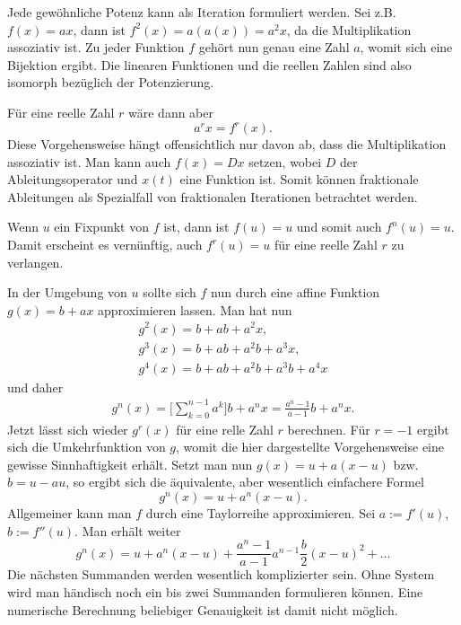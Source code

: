 \documentclass[a4paper,10pt,fleqn,twocolumn,twoside]{article}
\begin{document}
Jede gewöhnliche Potenz kann als Iteration formuliert werden.
Sei z.B. \(f(x)=ax\), dann ist \(f^2(x)=a(a(x))=a^2 x\), da die
Multiplikation assoziativ ist. Zu jeder Funktion \(f\) gehört nun
genau eine Zahl \(a\), womit sich eine Bijektion ergibt. Die
linearen Funktionen und die reellen Zahlen sind also isomorph
bezüglich der {\glqq}Potenzierung{\grqq}.

Für eine reelle Zahl \(r\) wäre dann aber
\[a^r x = f^r(x).\]
Diese Vorgehensweise hängt offensichtlich nur davon ab, dass
die Multiplikation assoziativ ist. Man kann auch \(f(x)=Dx\) setzen,
wobei \(D\) der Ableitungsoperator und \(x(t)\) eine Funktion ist.
Somit können fraktionale Ableitungen als Spezialfall von
fraktionalen Iterationen betrachtet werden.

Wenn \(u\) ein Fixpunkt von \(f\) ist, dann ist \(f(u)=u\) und
somit auch \(f^n(u)=u\). Damit erscheint es vernünftig, auch
\(f^r(u)=u\) für eine reelle Zahl \(r\) zu verlangen.

In der Umgebung von \(u\) sollte sich \(f\) nun durch eine
affine Funktion \(g(x)=b+ax\) approximieren lassen. Man hat
nun
\begin{gather*}
g^2(x) = b+ab+a^2x,\\
g^3(x) = b+ab+a^2b+a^3x,\\
g^4(x) = b+ab+a^2b+a^3b+a^4x
\end{gather*}
und daher
\begin{gather*}
g^n(x) = \bigg[\sum_{k=0}^{n-1}a^k\bigg]b+a^nx
= \frac{a^n-1}{a-1}b+a^nx.
\end{gather*}
Jetzt lässt sich wieder \(g^r(x)\) für eine relle Zahl \(r\)
berechnen. Für \(r=-1\) ergibt sich die Umkehrfunktion von \(g\),
womit die hier dargestellte Vorgehensweise eine gewisse Sinnhaftigkeit
erhält. Setzt man nun \(g(x)=u+a(x-u)\) bzw. \(b=u-au\), so ergibt
sich die äquivalente, aber wesentlich einfachere Formel
\[g^n(x) = u+a^n(x-u).\]
Allgemeiner kann man \(f\) durch eine Taylorreihe approximieren.
Sei \(a:=f'(u)\), \(b:=f''(u)\). Man erhält weiter
\[g^n(x) = u+a^n(x-u)
+\frac{a^n-1}{a-1}a^{n-1}\frac{b}{2}(x-u)^2+\ldots\]
Die nächsten Summanden werden wesentlich komplizierter sein. Ohne
System wird man händisch noch ein bis zwei Summanden formulieren
können. Eine numerische Berechnung beliebiger Genauigkeit ist damit
nicht möglich.
\end{document}
